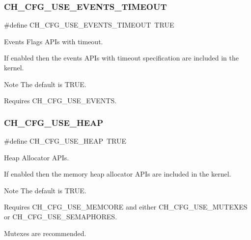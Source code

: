 \subsubsection{\texorpdfstring{C\+H\+\_\+\+C\+F\+G\+\_\+\+U\+S\+E\+\_\+\+E\+V\+E\+N\+T\+S\+\_\+\+T\+I\+M\+E\+O\+UT}{CH\_CFG\_USE\_EVENTS\_TIMEOUT}}
{\footnotesize\ttfamily \#define C\+H\+\_\+\+C\+F\+G\+\_\+\+U\+S\+E\+\_\+\+E\+V\+E\+N\+T\+S\+\_\+\+T\+I\+M\+E\+O\+UT~T\+R\+UE}



Events Flags A\+P\+Is with timeout. 

If enabled then the events A\+P\+Is with timeout specification are included in the kernel.

\begin{DoxyNote}{Note}
The default is {\ttfamily T\+R\+UE}. 

Requires {\ttfamily C\+H\+\_\+\+C\+F\+G\+\_\+\+U\+S\+E\+\_\+\+E\+V\+E\+N\+TS}. 
\end{DoxyNote}
\hypertarget{group__config_ga0968280d9bbbcda48177d14d77058737}{}\label{group__config_ga0968280d9bbbcda48177d14d77058737} 
\subsubsection{\texorpdfstring{C\+H\+\_\+\+C\+F\+G\+\_\+\+U\+S\+E\+\_\+\+H\+E\+AP}{CH\_CFG\_USE\_HEAP}}
{\footnotesize\ttfamily \#define C\+H\+\_\+\+C\+F\+G\+\_\+\+U\+S\+E\+\_\+\+H\+E\+AP~T\+R\+UE}



Heap Allocator A\+P\+Is. 

If enabled then the memory heap allocator A\+P\+Is are included in the kernel.

\begin{DoxyNote}{Note}
The default is {\ttfamily T\+R\+UE}. 

Requires {\ttfamily C\+H\+\_\+\+C\+F\+G\+\_\+\+U\+S\+E\+\_\+\+M\+E\+M\+C\+O\+RE} and either {\ttfamily C\+H\+\_\+\+C\+F\+G\+\_\+\+U\+S\+E\+\_\+\+M\+U\+T\+E\+X\+ES} or {\ttfamily C\+H\+\_\+\+C\+F\+G\+\_\+\+U\+S\+E\+\_\+\+S\+E\+M\+A\+P\+H\+O\+R\+ES}. 

Mutexes are recommended. 
\end{DoxyNote}
\hypertarget{group__config_gae7b225553e9e069eda0dc0a251e0882c}{}\label{group__config_gae7b225553e9e069eda0dc0a251e0882c} 

